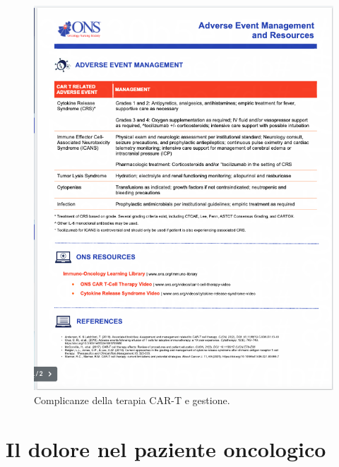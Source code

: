 \begin{figure}[H]
    \begin{center}
    \includegraphics[width=0.9\columnwidth]{img/CAR-T-SIDE-EFFECTS.png}
    \end{center}
    \caption{Complicanze della terapia CAR-T e gestione.
    \cite{ONSCART}}

\end{figure}


\section{Il dolore nel paziente oncologico}


